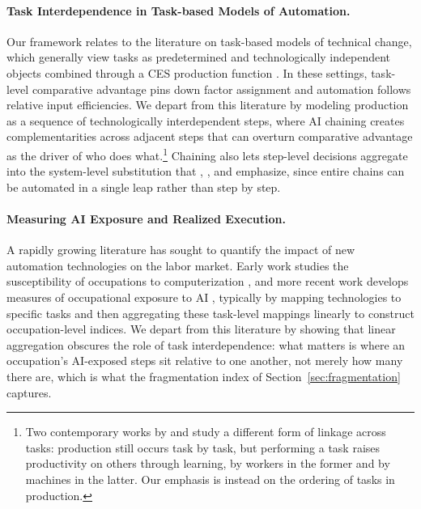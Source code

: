 \paragraph{Task Interdependence in Task-based Models of Automation.}
Our framework relates to the literature on task-based models of technical change, which generally view tasks as predetermined and technologically independent objects combined through a CES production function \citep{acemoglu2011skills, acemoglu2018, acemoglu2019automation, acemoglu2024tasks}.
In these settings, task-level comparative advantage pins down factor assignment and automation follows relative input efficiencies.
We depart from this literature by modeling production as a sequence of technologically interdependent steps, where AI chaining creates complementarities across adjacent steps that can overturn comparative advantage as the driver of who does what.\footnote{Two contemporary works by \cite{trammell2026workflows} and \cite{farboodi2026data} study a different form of linkage across tasks: production still occurs task by task, but performing a task raises productivity on others through learning, by workers in the former and by machines in the latter. Our emphasis is instead on the ordering of tasks in production.}
Chaining also lets step-level decisions aggregate into the system-level substitution that \cite{autor2003skill}, \cite{acemoglu2019automation}, and \cite{bresnahan2002information} emphasize, since entire chains can be automated in a single leap rather than step by step.


\paragraph{Measuring AI Exposure and Realized Execution.}
A rapidly growing literature has sought to quantify the impact of new automation technologies on the labor market.
Early work studies the susceptibility of occupations to computerization \citep{frey2017future}, and more recent work develops measures of occupational exposure to AI \citep{brynjolfsson2018can, webb2020impact, felten2021occupational, eloundou2023gpts, hampole2025artificial, tomlinson2025working}, typically by mapping technologies to specific tasks and then aggregating these task-level mappings linearly to construct occupation-level indices.
We depart from this literature by showing that linear aggregation obscures the role of task interdependence: what matters is where an occupation's AI-exposed steps sit relative to one another, not merely how many there are, which is what the fragmentation index of Section~\ref{sec:fragmentation} captures.


